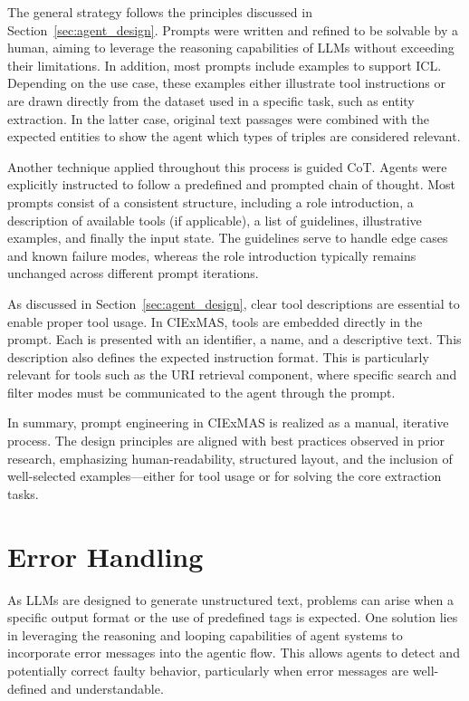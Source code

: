 \documentclass[a4paper,oneside,bibliography=totoc]{scrbook}
\begin{document}
The general strategy follows the principles discussed in Section~\ref{sec:agent_design}. Prompts were written and refined to be solvable by a human, aiming to leverage the reasoning capabilities of \acp{LLM} without exceeding their limitations. In addition, most prompts include examples to support \ac{ICL}. Depending on the use case, these examples either illustrate tool instructions or are drawn directly from the dataset used in a specific task, such as entity extraction. In the latter case, original text passages were combined with the expected entities to show the agent which types of triples are considered relevant.

Another technique applied throughout this process is guided \ac{CoT}. Agents were explicitly instructed to follow a predefined and prompted chain of thought. Most prompts consist of a consistent structure, including a role introduction, a description of available tools (if applicable), a list of guidelines, illustrative examples, and finally the input state. The guidelines serve to handle edge cases and known failure modes, whereas the role introduction typically remains unchanged across different prompt iterations.

As discussed in Section~\ref{sec:agent_design}, clear tool descriptions are essential to enable proper tool usage. In CIExMAS, tools are embedded directly in the prompt. Each is presented with an identifier, a name, and a descriptive text. This description also defines the expected instruction format. This is particularly relevant for tools such as the URI retrieval component, where specific search and filter modes must be communicated to the agent through the prompt.

In summary, prompt engineering in CIExMAS is realized as a manual, iterative process. The design principles are aligned with best practices observed in prior research, emphasizing human-readability, structured layout, and the inclusion of well-selected examples—either for tool usage or for solving the core extraction tasks.

\section{Error Handling}
\label{sec:error_incorportion}

As \acp{LLM} are designed to generate unstructured text, problems can arise when a specific output format or the use of predefined tags is expected. One solution lies in leveraging the reasoning and looping capabilities of agent systems to incorporate error messages into the agentic flow. This allows agents to detect and potentially correct faulty behavior, particularly when error messages are well-defined and understandable.
\end{document}
